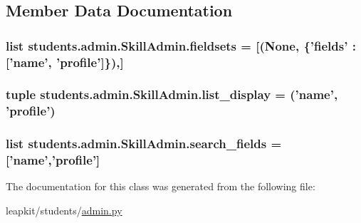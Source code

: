 \subsection{Member Data Documentation}
\hypertarget{classstudents_1_1admin_1_1_skill_admin_a454e45e7078bd30e268d1e0c89a38575}{
\subsubsection[{fieldsets}]{\setlength{\rightskip}{0pt plus 5cm}list students.\-admin.\-Skill\-Admin.\-fieldsets = \mbox{[}(None, \{'fields' \-: \mbox{[}'name', 'profile'\mbox{]}\}),\mbox{]}\hspace{0.3cm}{\ttfamily [static]}}}\label{classstudents_1_1admin_1_1_skill_admin_a454e45e7078bd30e268d1e0c89a38575}
\hypertarget{classstudents_1_1admin_1_1_skill_admin_a91d65295b3213f8a1eec76ae8b9f43f7}{
\subsubsection[{list\-\_\-display}]{\setlength{\rightskip}{0pt plus 5cm}tuple students.\-admin.\-Skill\-Admin.\-list\-\_\-display = ('name', 'profile')\hspace{0.3cm}{\ttfamily [static]}}}\label{classstudents_1_1admin_1_1_skill_admin_a91d65295b3213f8a1eec76ae8b9f43f7}
\hypertarget{classstudents_1_1admin_1_1_skill_admin_a4ed1cf2d0e90b6f04b2cd387906b1952}{
\subsubsection[{search\-\_\-fields}]{\setlength{\rightskip}{0pt plus 5cm}list students.\-admin.\-Skill\-Admin.\-search\-\_\-fields = \mbox{[}'name','profile'\mbox{]}\hspace{0.3cm}{\ttfamily [static]}}}\label{classstudents_1_1admin_1_1_skill_admin_a4ed1cf2d0e90b6f04b2cd387906b1952}


The documentation for this class was generated from the following file\-:\begin{DoxyCompactItemize}
\item 
leapkit/students/\hyperlink{admin_8py}{admin.\-py}\end{DoxyCompactItemize}
